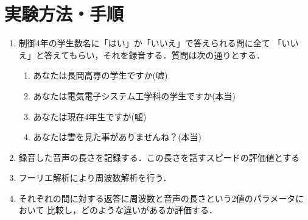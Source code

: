 \documentclass[titlepage]{jarticle}
\begin{document}
\section{実験方法・手順}
\begin{enumerate}
  \item 制御4年の学生数名に「はい」か「いいえ」で答えられる問に全て
        「いいえ」と答えてもらい，それを録音する．質問は次の通りとする．
        \begin{enumerate}
          \item あなたは長岡高専の学生ですか(嘘)
          \item あなたは電気電子システム工学科の学生ですか(本当)
          \item あなたは現在4年生ですか(嘘)
          \item あなたは雪を見た事がありませんね？(本当)
        \end{enumerate}
  \item 録音した音声の長さを記録する．この長さを話すスピードの評価値とする
  \item フーリエ解析により周波数解析を行う．
  \item それぞれの問に対する返答に周波数と音声の長さという2値のパラメータにおいて
        比較し，どのような違いがあるか評価する．
\end{enumerate}
\end{document}

